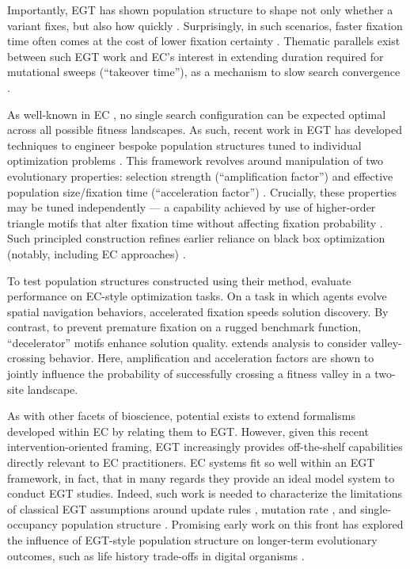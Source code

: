 Importantly, EGT has shown population structure to shape not only whether a variant fixes, but also how quickly \citep{askari2015analytical}.
Surprisingly, in such scenarios, faster fixation time often comes at the cost of lower fixation certainty \citep{frean2013effect}.
Thematic parallels exist between such EGT work and EC's interest in extending duration required for mutational sweeps (``takeover time''), as a mechanism to slow search convergence \citep{goldberg1991comparative,rudolph2001takeover,giacobini2005selection,sudholt2015parallel}.

As well-known in EC \citep{wolpert1997no}, no single search configuration can be expected optimal across all possible fitness landscapes.
As such, recent work in EGT has developed techniques to engineer bespoke population structures tuned to individual optimization problems \citep{kuo2024theory,kuo2024evolutionary}.
This framework revolves around manipulation of two evolutionary properties: selection strength (``amplification factor'') \citep{kuo2024theory} and effective population size/fixation time (``acceleration factor'') \citep{kuo2024evolutionary}.
Crucially, these properties may be tuned independently --- a capability achieved by use of higher-order triangle motifs that alter fixation time without affecting fixation probability \citep{kuo2024evolutionary}.
Such principled construction refines earlier reliance on black box optimization (notably, including EC approaches) \citep{moller2019exploring}.

To test population structures constructed using their method, \citet{kuo2024evolutionary} evaluate performance on EC-style optimization tasks.
On a task in which agents evolve spatial navigation behaviors, accelerated fixation speeds solution discovery.
By contrast, to prevent premature fixation on a rugged benchmark function, ``decelerator'' motifs enhance solution quality.
\citet{kuo2024evolutionarymutation} extends analysis to consider valley-crossing behavior.
Here, amplification and acceleration factors are shown to jointly influence the probability of successfully crossing a fitness valley in a two-site landscape.

As with other facets of bioscience, potential exists to extend formalisms developed within EC by relating them to EGT.
However, given this recent intervention-oriented framing, EGT increasingly provides off-the-shelf capabilities directly relevant to EC practitioners.
EC systems fit so well within an EGT framework, in fact, that in many regards they provide an ideal model system to conduct EGT studies.
Indeed, such work is needed to characterize the limitations of classical EGT assumptions around update rules \citep{hindersin2015most}, mutation rate \citep{sharma2023selfloops}, and single-occupancy population structure \citep{broom2012general}.
Promising early work on this front has explored the influence of EGT-style population structure on longer-term evolutionary outcomes, such as life history trade-offs in digital organisms \citep{gordon2025environmental}.

